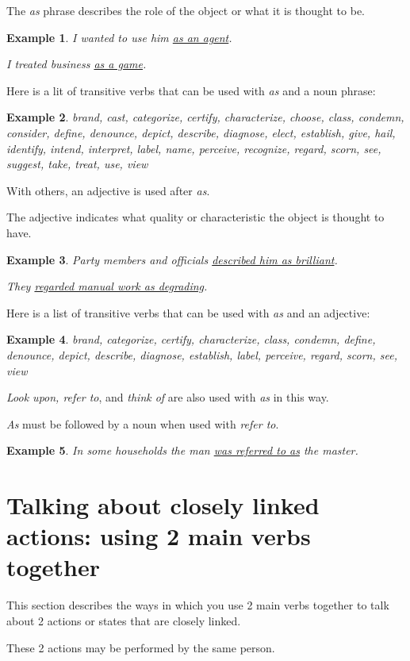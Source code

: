 \documentclass[oneside]{book}
\numberwithin{equation}{section}
\newtheorem{example}{Example}[section]
\begin{document}
The \textit{as} phrase describes the role of the object or what it is thought to be.
\begin{example}
    I wanted to use him \underline{as an agent}.
    
    I treated business \underline{as a game}.
\end{example}
Here is a lit of transitive verbs that can be used with \textit{as} and a noun phrase:
\begin{example}
    brand, cast, categorize, certify, characterize, choose, class, condemn, consider, define, denounce, depict, describe, diagnose, elect, establish, give, hail, identify, intend, interpret, label, name, perceive, recognize, regard, scorn, see, suggest, take, treat, use, view
\end{example}
With others, an adjective is used after \textit{as}.

The adjective indicates what quality or characteristic the object is thought to have.
\begin{example}
    Party members and officials \underline{described him as brilliant}.
    
    They \underline{regarded manual work as degrading}.
\end{example}
Here is a list of transitive verbs that can be used with \textit{as} and an adjective:
\begin{example}
    brand, categorize, certify, characterize, class, condemn, define, denounce, depict, describe, diagnose, establish, label, perceive, regard, scorn, see, view
\end{example}
%
\noindent{} \textit{Look upon, refer to}, and \textit{think of} are also used with \textit{as} in this way.

\textit{As} must be followed by a noun when used with \textit{refer to}.
\begin{example}
    In some households the man \underline{was referred to as} the master.
\end{example}

\section{Talking about closely linked actions: using 2 main verbs together}
\noindent{} This section describes the ways in which you use 2 main verbs together to talk about 2 actions or states that are closely linked.

%
These 2 actions may be performed by the same person.
\end{document}
